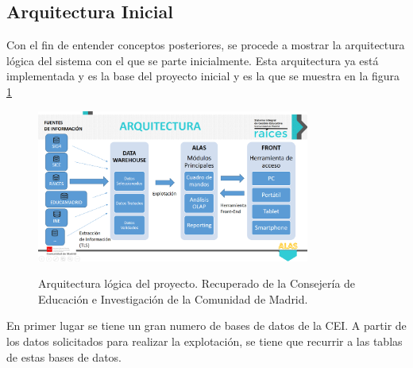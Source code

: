 \subsection{Arquitectura Inicial}
Con el fin de entender conceptos posteriores, se procede a mostrar la arquitectura lógica del sistema con el que se parte inicialmente. Esta arquitectura ya está implementada y es la base del proyecto inicial y es la que se muestra en la figura \ref{fig:arquitecturaDWH2}
\begin{figure}[h]
	\centering
	\caption{Arquitectura lógica del proyecto. Recuperado de la Consejería de Educación e Investigación de la Comunidad de Madrid.}
	\includegraphics[width=0.8\textwidth]{recursos/arquitecturaDWH2}
	\label{fig:arquitecturaDWH2}
\end{figure}
\FloatBarrier

En primer lugar se tiene un gran numero de bases de datos de la CEI. A partir de los datos solicitados para realizar la explotación, se tiene que recurrir a las tablas de estas bases de datos.

